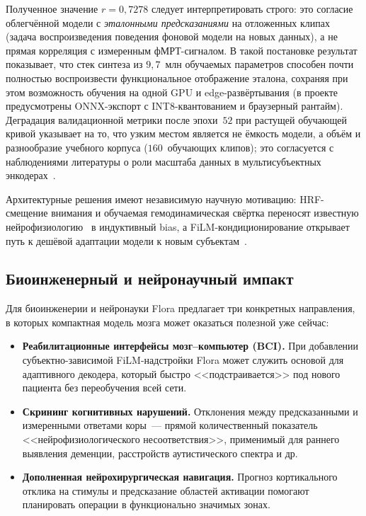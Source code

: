 \documentclass[11pt,a4paper]{article}
\begin{document}
Полученное значение $r = 0{,}7278$ следует интерпретировать строго:
это согласие облегчённой модели с \emph{эталонными предсказаниями}
на отложенных клипах (задача воспроизведения поведения фоновой
модели на новых данных), а не прямая корреляция с измеренным
фМРТ-сигналом. В такой постановке результат показывает, что стек
синтеза из $9{,}7$~млн обучаемых параметров способен почти полностью
воспроизвести функциональное отображение эталона, сохраняя при
этом возможность обучения на одной GPU и edge-развёртывания (в
проекте предусмотрены ONNX-экспорт с INT8-квантованием и
браузерный рантайм). Деградация валидационной метрики после
эпохи~$52$ при растущей обучающей кривой указывает на то, что
узким местом является не ёмкость модели, а объём и разнообразие
учебного корпуса ($160$~обучающих клипов); это согласуется
с наблюдениями литературы о роли масштаба данных в мультисубъектных
энкодерах~\cite{Scotti2024}.

Архитектурные решения имеют независимую научную мотивацию:
HRF-смещение внимания и обучаемая гемодинамическая свёртка переносят
известную нейрофизиологию~\cite{Glover1999,Lindquist2019} в
индуктивный bias, а FiLM-кондиционирование открывает путь к дешёвой
адаптации модели к новым субъектам~\cite{Perez2018}.

\subsection{Биоинженерный и нейронаучный импакт}
\label{sec:disc-impact}

Для биоинженерии и нейронауки Flora предлагает три конкретных
направления, в которых компактная модель мозга может оказаться
полезной уже сейчас:

\begin{itemize}[leftmargin=*]
    \item \textbf{Реабилитационные интерфейсы мозг--компьютер (BCI).}
          При добавлении субъектно-зависимой FiLM-надстройки Flora
          может служить основой для адаптивного декодера, который
          быстро <<подстраивается>> под нового пациента без
          переобучения всей сети.
    \item \textbf{Скрининг когнитивных нарушений.}
          Отклонения между предсказанными и измеренными ответами
          коры~--- прямой количественный показатель
          <<нейрофизиологического несоответствия>>, применимый для
          раннего выявления деменции, расстройств аутистического
          спектра и др.
    \item \textbf{Дополненная нейрохирургическая навигация.}
          Прогноз кортикального отклика на стимулы и предсказание
          областей активации помогают планировать операции в
          функционально значимых зонах.
\end{itemize}
\end{document}
